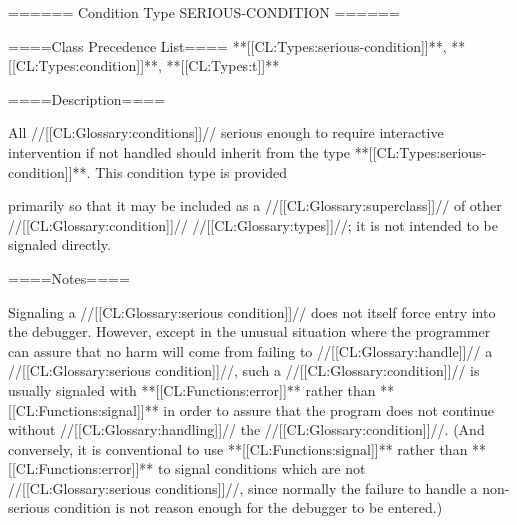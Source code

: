 ====== Condition Type SERIOUS-CONDITION ======

====Class Precedence List==== **[[CL:Types:serious-condition]]**, **[[CL:Types:condition]]**, **[[CL:Types:t]]**

====Description====

All //[[CL:Glossary:conditions]]// serious enough to require interactive intervention if not handled should inherit from the type **[[CL:Types:serious-condition]]**. This condition type is provided

primarily so that it may be included as a //[[CL:Glossary:superclass]]// of other //[[CL:Glossary:condition]]// //[[CL:Glossary:types]]//; it is not intended to be signaled directly.

====Notes====

Signaling a //[[CL:Glossary:serious condition]]// does not itself force entry into the debugger. However, except in the unusual situation where the programmer can assure that no harm will come from failing to //[[CL:Glossary:handle]]// a //[[CL:Glossary:serious condition]]//, such a //[[CL:Glossary:condition]]// is usually signaled with **[[CL:Functions:error]]** rather than **[[CL:Functions:signal]]** in order to assure that the program does not continue without //[[CL:Glossary:handling]]// the //[[CL:Glossary:condition]]//. (And conversely, it is conventional to use **[[CL:Functions:signal]]** rather than **[[CL:Functions:error]]** to signal conditions which are not //[[CL:Glossary:serious conditions]]//, since normally the failure to handle a non-serious condition is not reason enough for the debugger to be entered.)

